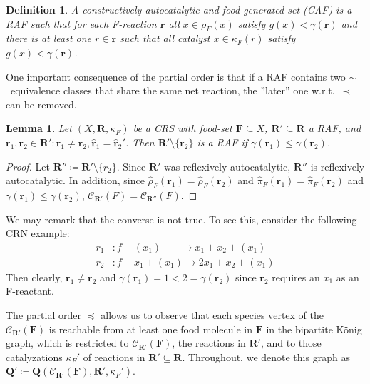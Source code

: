 \documentclass[pdflatex]{sn-jnl}
\theoremstyle{thmstyleone}%
\newtheorem{lemma}[theorem]{Lemma}%
\theoremstyle{examplesty}%
\theoremstyle{thmstylethree}%
\newtheorem{definition}[theorem]{Definition}%
\newcommand{\queen}{\mathbf{Q}}
\newcommand{\food}{\ensuremath{\mathbf{F}}}
\newcommand{\closure}[2]{\mathscr{C}_{#1}(#2)}
\newcommand{\FR}[0]{\mathbf{R}}
\newcommand{\fr}[0]{\mathbf{r}}
\newcommand{\RAF}[0]{\mathbf{R}'}
\newcommand{\cat}{\kappa_F}
\newcommand{\sgen}{g}
\newcommand{\rgen}{\gamma}
\newcommand{\feducts}{\rho_F}
\newcommand{\nfeducts}{\hat{\rho}_F}
\newcommand{\nfproducts}{\hat{\pi}_F}
\begin{document}
\begin{definition}
  A \emph{constructively autocatalytic and food-generated} set (CAF) is a
  RAF such that for each F-reaction $\fr$ all $x\in \feducts(x)$ satisfy
  $\sgen(x)<\rgen(\fr)$ and there is at least one $r\in \fr$ such that all
  catalyst $x\in \cat(r)$ satisfy $\sgen(x)< \rgen(\fr)$.
\end{definition}
One important consequence of the partial order is that if a RAF contains
two $\sim$~equivalence classes that share the same net reaction, the
''later'' one w.r.t.\ $\prec$ can be removed.
\vspace{6pt}
\begin{lemma}\label{lem:OneFReacPerRAF}
  Let $(X,\FR,\cat)$ be a CRS with food-set $\food\subseteq X$,
  $\RAF\subseteq \FR$ a RAF, and $\fr_1,\fr_2 \in \RAF: \fr_1\neq \fr_2,
  \hat{\fr}_1 = \hat{\fr}_2'$. Then $\RAF\setminus \{\fr_2\}$ is a RAF if
  $\rgen(\fr_1)\leq \rgen(\fr_2)$.
\end{lemma}
\begin{proof}
  Let $\RAF' \coloneqq \RAF \setminus \{r_2\}$. Since $\RAF$ was
  reflexively autocatalytic, $\RAF'$ is reflexively autocatalytic. In
  addition, since $\nfeducts(\fr_1)=\nfeducts(\fr_2)$ and
  $\nfproducts(\fr_1)=\nfproducts(\fr_2)$ and $\rgen(\fr_1)\leq
  \rgen(\fr_2)$, $\closure{\RAF}{F} = \closure{\RAF'}{F}$.
\end{proof}
\vspace{6pt} 
\noindent We may remark that the converse is not true. To see this, consider the following CRN example:
\begin{equation}
  \begin{split}
    r_1&: f + (x_1) \hspace{22pt} \rightarrow x_1 + x_2 + (x_1)\\
    r_2&: f + x_1 + (x_1) \rightarrow 2x_1 + x_2 + (x_1)
  \end{split}
\end{equation}
Then clearly, $\fr_1\neq \fr_2$ and $\rgen(\fr_1) = 1 < 2 = \rgen(\fr_2)$
since $\fr_2$ requires an $x_1$ as an F-reactant.

The partial order $\preceq$ allows us to observe that each species vertex
of the $\closure{\RAF}{\food}$ is reachable from at least one food molecule
in $\food$ in the bipartite K\"onig graph, which is restricted to
$\closure{\RAF}{\food}$, the reactions in $\RAF$, and to those
catalyzations $\cat'$ of reactions in $\RAF\subseteq \FR$. Throughout, we
denote this graph as $\queen'\coloneqq \queen(\closure{\RAF}{\food}, \RAF,
\cat')$.
\end{document}

